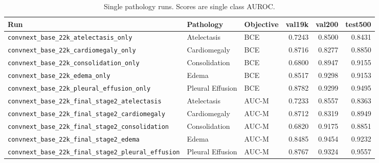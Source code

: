 \begin{table}[H]
  \caption{Single pathology runs. Scores are single class AUROC.}
  \centering
  \footnotesize
  \setlength{\tabcolsep}{4pt}
  \begin{tabular}{lllrrr}
    \toprule
    Run & Pathology & Objective & val19k & val200 & test500 \\
    \midrule
    \texttt{\scriptsize convnext\_base\_22k\_atelectasis\_only} & Atelectasis & BCE & 0.7243 & 0.8500 & 0.8431 \\
    \texttt{\scriptsize convnext\_base\_22k\_cardiomegaly\_only} & Cardiomegaly & BCE & 0.8716 & 0.8277 & 0.8850 \\
    \texttt{\scriptsize convnext\_base\_22k\_consolidation\_only} & Consolidation & BCE & 0.6800 & 0.8947 & 0.9155 \\
    \texttt{\scriptsize convnext\_base\_22k\_edema\_only} & Edema & BCE & 0.8517 & 0.9298 & 0.9153 \\
    \texttt{\scriptsize convnext\_base\_22k\_pleural\_effusion\_only} & Pleural Effusion & BCE & 0.8782 & 0.9299 & 0.9495 \\
    \texttt{\scriptsize convnext\_base\_22k\_final\_stage2\_atelectasis} & Atelectasis & AUC-M & 0.7233 & 0.8557 & 0.8363 \\
    \texttt{\scriptsize convnext\_base\_22k\_final\_stage2\_cardiomegaly} & Cardiomegaly & AUC-M & 0.8712 & 0.8319 & 0.8949 \\
    \texttt{\scriptsize convnext\_base\_22k\_final\_stage2\_consolidation} & Consolidation & AUC-M & 0.6820 & 0.9175 & 0.8851 \\
    \texttt{\scriptsize convnext\_base\_22k\_final\_stage2\_edema} & Edema & AUC-M & 0.8485 & 0.9454 & 0.9232 \\
    \texttt{\scriptsize convnext\_base\_22k\_final\_stage2\_pleural\_effusion} & Pleural Effusion & AUC-M & 0.8767 & 0.9324 & 0.9557 \\
    \bottomrule
  \end{tabular}
  \label{tab:perdisease}
\end{table}


